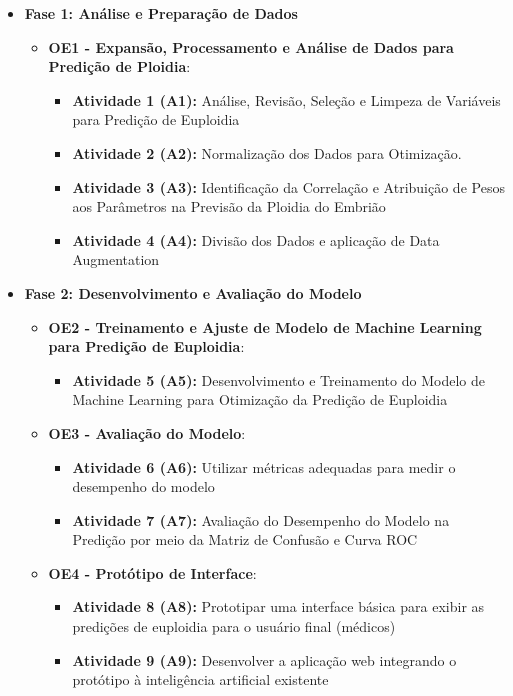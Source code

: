 \begin{itemize}
    \item \textbf{Fase 1: Análise e Preparação de Dados}
    \begin{itemize}
        \item \textbf{OE1 - Expansão, Processamento e Análise de Dados para Predição de Ploidia}: 
        \begin{itemize}
            \item \textbf{Atividade 1 (A1):} Análise, Revisão, Seleção e Limpeza de Variáveis para Predição de Euploidia 
            \item \textbf{Atividade 2 (A2):} Normalização dos Dados para Otimização.
            \item \textbf{Atividade 3 (A3):} Identificação da Correlação e Atribuição de Pesos aos Parâmetros na Previsão da Ploidia do Embrião 
            \item \textbf{Atividade 4 (A4):} Divisão dos Dados e aplicação de Data Augmentation
        \end{itemize}
    \end{itemize}

    \item \textbf{Fase 2: Desenvolvimento e Avaliação do Modelo}
    \begin{itemize}
        \item \textbf{OE2 - Treinamento e Ajuste de Modelo de Machine Learning para Predição de Euploidia}: 
        \begin{itemize}
            \item \textbf{Atividade 5 (A5):} Desenvolvimento e Treinamento do Modelo de Machine Learning para Otimização da Predição de Euploidia
        \end{itemize}

        \item \textbf{OE3 - Avaliação do Modelo}: 
        \begin{itemize}
            \item \textbf{Atividade 6 (A6):} Utilizar métricas adequadas para medir o desempenho do modelo
            \item \textbf{Atividade 7 (A7):} Avaliação do Desempenho do Modelo na Predição por meio da Matriz de Confusão e Curva ROC
        \end{itemize}

        \item \textbf{OE4 - Protótipo de Interface}: 
        \begin{itemize}
            \item \textbf{Atividade 8 (A8):} Prototipar uma interface básica para exibir as predições de euploidia para o usuário final (médicos)
            \item \textbf{Atividade 9 (A9):} Desenvolver a aplicação web integrando o protótipo à inteligência artificial existente
        \end{itemize}
    \end{itemize}
\end{itemize}

